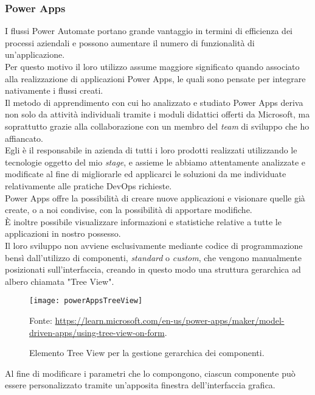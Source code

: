\subsubsection*{Power Apps}
I flussi Power Automate portano grande vantaggio in termini di efficienza dei processi aziendali e possono aumentare il numero di funzionalità di un'applicazione.\\
Per questo motivo il loro utilizzo assume maggiore significato quando associato alla realizzazione di applicazioni Power Apps, le quali sono pensate per integrare nativamente i flussi creati.\\
Il metodo di apprendimento con cui ho analizzato e studiato Power Apps deriva non solo da attività individuali tramite i moduli didattici offerti da Microsoft, ma soprattutto grazie alla collaborazione con un membro del \emph{team} di sviluppo che ho affiancato.\\
Egli è il responsabile in azienda di tutti i loro prodotti realizzati utilizzando le tecnologie oggetto del mio \emph{stage}, e assieme le abbiamo attentamente analizzate e modificate al fine di migliorarle ed applicarci le soluzioni da me individuate relativamente alle pratiche \gls{DevOps} richieste.\\
Power Apps offre la possibilità di creare nuove applicazioni e visionare quelle già create, o a noi condivise, con la possibilità di apportare modifiche.\\
È inoltre possibile visualizzare informazioni e statistiche relative a tutte le applicazioni in nostro possesso.\\
Il loro sviluppo non avviene esclusivamente mediante codice di programmazione bensì dall'utilizzo di componenti, \emph{standard} o \emph{custom}, che vengono manualmente posizionati sull'interfaccia, creando in questo modo una struttura gerarchica ad albero chiamata "Tree View".
\begin{figure}[htbp] 
    \centering 
    \texttt{[image: powerAppsTreeView]} 
    \caption{Elemento Tree View per la gestione gerarchica dei componenti.}
    \label{fig:powerAppsTreeView}
    \vspace{1mm}
    Fonte: \url{https://learn.microsoft.com/en-us/power-apps/maker/model-driven-apps/using-tree-view-on-form}.
\end{figure}
\newline \noindent Al fine di modificare i parametri che lo compongono, ciascun componente può essere personalizzato tramite un'apposita finestra dell'interfaccia grafica.\\
